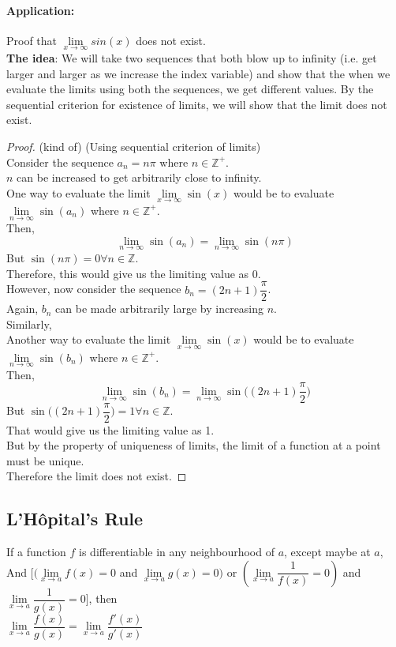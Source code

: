 \documentclass[14]{article}
\theoremstyle{definition}
\theoremstyle{case}
\begin{document}
\paragraph{Application:}
Proof that $\lim\limits_{x \to \infty} sin(x)$ does not exist.\\
\textbf{The idea}: We will take two sequences that both blow up to infinity (i.e. get larger and larger as we increase the index variable) and show that the when we evaluate the limits using both the sequences, we get different values. By the sequential criterion for existence of limits, we will show that the limit does not exist.
\begin{proof} (kind of) (Using sequential criterion of limits)\\
Consider the sequence $a_n = n \pi$ where $n \in \mathbb{Z^+}$.\\
$n$ can be increased to get arbitrarily close to infinity.\\
One way to evaluate the limit $\lim\limits_{x \to \infty} \sin(x)$ would be to evaluate $\lim\limits_{n \to \infty}\sin(a_n)$ where $n \in \mathbb{Z^+}$.\\
Then,
\[\lim\limits_{n \to \infty}\sin(a_n)= \lim\limits_{n \to \infty} \sin(n\pi)\]
But $\sin(n\pi) = 0 \forall n \in \mathbb{Z}$.\\
Therefore, this would give us the limiting value as $0$.\\
However, now consider the sequence $b_n = (2n+1)\dfrac{\pi}{2}$.\\
Again, $b_n$ can be made arbitrarily large by increasing $n$.\\
Similarly, \\Another way to evaluate the limit $\lim\limits_{x \to \infty} \sin(x)$ would be to evaluate $\lim\limits_{n \to \infty}\sin(b_n)$ where $n \in \mathbb{Z^+}$.\\
Then,
\[\lim\limits_{n\to \infty} \sin(b_n) = \lim\limits_{n \to \infty} \sin\Big((2n+1)\dfrac{\pi}{2}\Big)\]
But $\sin\Big((2n+1)\dfrac{\pi}{2}\Big) = 1 \forall n \in \mathbb{Z}$.\\
That would give us the limiting value as 1.\\
But by the property of uniqueness of limits, the limit of a function at a point must be unique.\\Therefore the limit does not exist.
\end{proof}
\subsection{L'Hôpital's Rule}
If a function $f$ is differentiable in any neighbourhood of $a$, except maybe at $a$,\\
And $\Big[(\lim\limits_{x \to a} f(x) = 0$ and $\lim\limits_{x \to a} g(x) = 0)$ or $(\lim\limits_{x \to a}\dfrac{1}{f(x)} = 0)$ and $\lim\limits_{x \to a} \dfrac{1}{g(x)} = 0\Big]$, then\\
$\lim\limits_{x \to a} \dfrac{f(x)}{g(x)} = \lim\limits_{x \to a} \dfrac{f'(x)}{g'(x)}$
\end{document}
